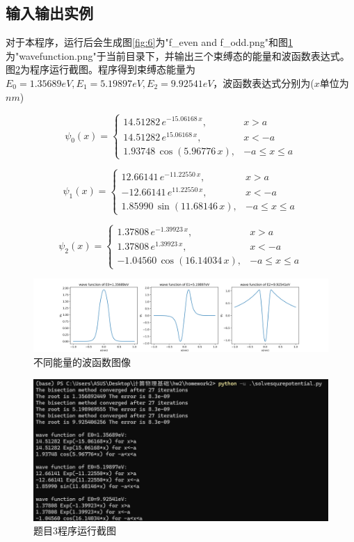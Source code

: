 \documentclass[11pt]{article}
\begin{document}
  \subsection{输入输出实例}
  对于本程序，运行后会生成图\ref{fig:6}为"f\_even and f\_odd.png"和图\ref{fig:7}为"wavefunction.png"于当前目录下，并输出三个束缚态的能量和波函数表达式。图\ref{fig:8}为程序运行截图。程序得到束缚态能量为$E_0=1.35689 eV,E_1=5.19897 eV,E_2=9.92541 eV$，波函数表达式分别为($x$单位为$nm$)
   

$$
\psi_0(x) = 
\begin{cases} 
14.51282 \, e^{-15.06168 \, x}, & x > a \\
14.51282 \, e^{15.06168 \, x}, & x < -a \\
1.93748 \, \cos(5.96776 \, x), & -a \leq x \leq a
\end{cases}
$$
  

  $$
  \psi_1(x) = 
  \begin{cases} 
  12.66141 \, e^{-11.22550 \, x}, & x > a \\
  -12.66141 \, e^{11.22550 \, x}, & x < -a \\
  1.85990 \, \sin(11.68146 \, x), & -a \leq x \leq a
  \end{cases}
  $$
  

  $$
  \psi_2(x) = 
  \begin{cases} 
    1.37808 \, e^{-1.39923 \, x}, & x > a \\
    1.37808 \, e^{1.39923 \, x}, & x < -a \\
  -1.04560 \, \cos(16.14034 \, x), & -a \leq x \leq a
  \end{cases}
  $$
  
  \begin{figure}[ht]
    \centering
    \includegraphics[width=1\linewidth]{photo/wavefunction.png}
    \caption{不同能量的波函数图像}
    \label{fig:7}
  \end{figure}
  \begin{figure}[ht]
    \centering
    \includegraphics[width=0.8\linewidth]{photo/fig8.png}
    \caption{题目3程序运行截图}
    \label{fig:8}
  \end{figure}
\end{document}
